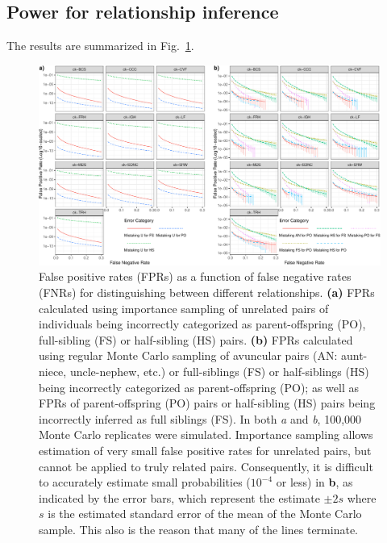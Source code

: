\subsection*{Power for relationship inference}

The results are summarized in Fig.~\ref{fig:fprs}.
\begin{figure}
\newcommand{\fprcap}{\footnotesize False positive rates (FPRs) as a function of false negative
rates (FNRs) for distinguishing between different relationships.  {\bf (a)} FPRs calculated
using importance sampling of unrelated pairs of individuals being incorrectly categorized as parent-offspring (PO),
full-sibling (FS) or half-sibling (HS) pairs.  {\bf (b)}  FPRs calculated using regular Monte Carlo
sampling of avuncular pairs (AN: aunt-niece, uncle-nephew, etc.) or full-siblings (FS) or half-siblings (HS) being 
incorrectly categorized as parent-offspring (PO); as well as FPRs of parent-offspring (PO) pairs or half-sibling (HS) 
pairs being incorrectly inferred as full siblings (FS).  In both {\em a} and {\em b}, 100,000 Monte Carlo replicates 
were simulated.  Importance sampling allows estimation of very small false positive rates for unrelated pairs, but 
cannot be applied to truly related pairs.  Consequently, it is difficult to accurately estimate small probabilities 
($10^{-4}$ or less) in {\bf b}, as indicated by the error bars, which represent the estimate $\pm 2s$ where $s$
is the estimated standard error of the mean of the Monte Carlo sample.  This also is the reason that many of the lines terminate.   }
\begin{center}
\includegraphics[width=\textwidth]{images/fpr-fnr-figure-crop.pdf}
\end{center}
\caption[\fprcap]{\fprcap}
\label{fig:fprs}
\end{figure}
